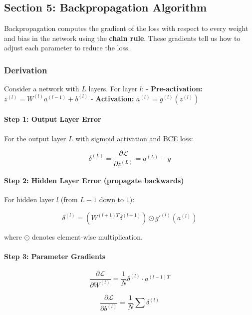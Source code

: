 \documentclass[11pt]{article}
\begin{document}
\subsection{Section 5: Backpropagation
Algorithm}\label{section-5-backpropagation-algorithm}

Backpropagation computes the gradient of the loss with respect to every
weight and bias in the network using the \textbf{chain rule}. These
gradients tell us how to adjust each parameter to reduce the loss.

\subsubsection{Derivation}\label{derivation}

Consider a network with \(L\) layers. For layer \(l\): -
\textbf{Pre-activation:} \(z^{(l)} = W^{(l)} a^{(l-1)} + b^{(l)}\) -
\textbf{Activation:} \(a^{(l)} = g^{(l)}(z^{(l)})\)

\paragraph{Step 1: Output Layer Error}\label{step-1-output-layer-error}

For the output layer \(L\) with sigmoid activation and BCE loss:

\[\delta^{(L)} = \frac{\partial \mathcal{L}}{\partial z^{(L)}} = a^{(L)} - y\]

\paragraph{Step 2: Hidden Layer Error (propagate
backwards)}\label{step-2-hidden-layer-error-propagate-backwards}

For hidden layer \(l\) (from \(L-1\) down to \(1\)):

\[\delta^{(l)} = \left( W^{(l+1)T} \delta^{(l+1)} \right) \odot g'^{(l)}(a^{(l)})\]

where \(\odot\) denotes element-wise multiplication.

\paragraph{Step 3: Parameter
Gradients}\label{step-3-parameter-gradients}

\[\frac{\partial \mathcal{L}}{\partial W^{(l)}} = \frac{1}{N} \delta^{(l)} \cdot a^{(l-1)T}\]

\[\frac{\partial \mathcal{L}}{\partial b^{(l)}} = \frac{1}{N} \sum \delta^{(l)}\]
\end{document}
